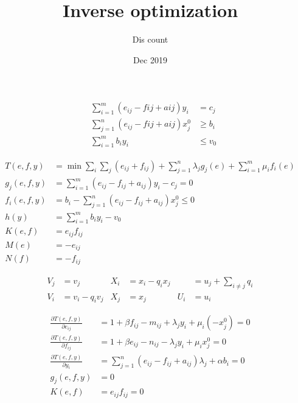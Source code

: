 \documentclass[UTF8]{article}
\title{Inverse optimization}
\author{Dis \cdot count}
\date{Dec 2019}
\begin{document}
\maketitle{}

\begin{equation}
\begin{align*}
&\sum_{i=1}^m (e_{ij}-f{ij}+a{ij})y_i & = c_j \\
&\sum_{j=1}^n (e_{ij}-f{ij}+a{ij})x_j^0 & \geq b_i \\
&\sum_{i=1}^m b_i y_i & \leq v_0
\end{align*}
\end{equation}

\begin{align}
  T(e,f,y) &= \min \sum_i\sum_j(e_{ij}+f_{ij}) + \sum_{j=1}^n \lambda_j
  g_j(e) + \sum_{i=1}^m \mu_i f_i(e) \\
  g_j(e,f,y) &= \sum_{i=1}^m (e_{ij}-f_{ij}+a_{ij})y_i-c_j = 0 \\
  f_i(e,f,y) &= b_i - \sum_{j=1}^n (e_{ij}-f_{ij}+a_{ij})x_j^0 \leq 0 \\
  h(y) &= \sum_{i=1}^m b_i y_i - v_0 \\
  K(e,f) &= e_{ij}f_{ij}  \\
  M(e) &= -e_{ij}  \\
  N(f) &= -f_{ij}
\end{align}


\begin{equation} \begin{aligned}
  V_j &= v_j                      &
  X_i &= x_i - q_i x_j            &
      &= u_j + \sum_{i\ne j} q_i \\
  V_i &= v_i - q_i v_j            &
  X_j &= x_j                      &
  U_i &= u_i

\end{aligned} \end{equation}



\begin{align}
  \frac{\partial T(e,f,y)}{\partial e_{ij}} &= 1+ \beta f_{ij} - m_{ij}+\lambda_j y_i + \mu_i(-x_j^0) = 0  \\
  \frac{\partial T(e,f,y)}{\partial f_{ij}} &= 1+ \beta e_{ij} - n_{ij}-\lambda_j y_i + \mu_i x_j^0 = 0    \\
  \frac{\partial T(e,f,y)}{\partial y_{i}} &=\sum_{j=1}^n(e_{ij}-f_{ij}+a_{ij})\lambda_j + \alpha b_i = 0 \\
  g_j(e,f,y) &=0 \\
  K(e,f) &= e_{ij}f_{ij} =0
  
\end{align}
\end{document}
